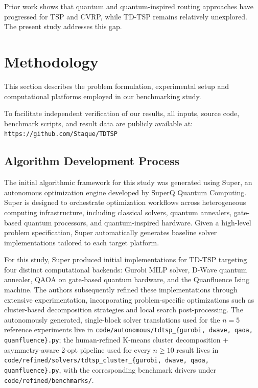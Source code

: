 \documentclass[conference]{IEEEtran}
\begin{document}
Prior work shows that quantum and quantum-inspired routing approaches have progressed for TSP and CVRP, while TD-TSP remains relatively unexplored. The present study addresses this gap.



\section{Methodology}
This section describes the problem formulation, experimental setup and computational platforms employed in our benchmarking study.

To facilitate independent verification of our results, all inputs, source code, benchmark scripts, and result data are publicly available at: \texttt{https://github.com/Staque/TDTSP}


\subsection{Algorithm Development Process}
The initial algorithmic framework for this study was generated using Super, an autonomous optimization engine developed by SuperQ Quantum Computing. Super is designed to orchestrate optimization workflows across heterogeneous computing infrastructure, including classical solvers, quantum annealers, gate-based quantum processors, and quantum-inspired hardware. Given a high-level problem specification, Super automatically generates baseline solver implementations tailored to each target platform.

For this study, Super produced initial implementations for TD-TSP targeting four distinct computational backends: Gurobi MILP solver, D-Wave quantum annealer, QAOA on gate-based quantum hardware, and the Quanfluence Ising machine. The authors subsequently refined these implementations through extensive experimentation, incorporating problem-specific optimizations such as cluster-based decomposition strategies and local search post-processing. The autonomously generated, single-block solver translations used for the $n=5$ reference experiments live in \texttt{code/autonomous/tdtsp\_\{gurobi, dwave, qaoa, quanfluence\}.py}; the human-refined K-means cluster decomposition + asymmetry-aware 2-opt pipeline used for every $n \ge 10$ result lives in \texttt{code/refined/solvers/tdtsp\_cluster\_\{gurobi, dwave, qaoa, quanfluence\}.py}, with the corresponding benchmark drivers under \texttt{code/refined/benchmarks/}. 
\end{document}
